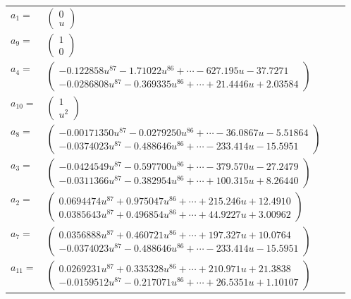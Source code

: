 \documentclass[1p]{elsarticle_modified}
\theoremstyle{definition}
\begin{document}
\begin{tabular}{m{7pt} m{180pt} m{7pt} m{180pt} }
\flushright $a_{1}=$&$\begin{pmatrix}0\\u\end{pmatrix}$ \\
\flushright $a_{9}=$&$\begin{pmatrix}1\\0\end{pmatrix}$ \\
\flushright $a_{4}=$&$\begin{pmatrix}-0.122858 u^{87}-1.71022 u^{86}+\cdots-627.195 u-37.7271\\-0.0286808 u^{87}-0.369335 u^{86}+\cdots+21.4446 u+2.03584\end{pmatrix}$ \\
\flushright $a_{10}=$&$\begin{pmatrix}1\\u^2\end{pmatrix}$ \\
\flushright $a_{8}=$&$\begin{pmatrix}-0.00171350 u^{87}-0.0279250 u^{86}+\cdots-36.0867 u-5.51864\\-0.0374023 u^{87}-0.488646 u^{86}+\cdots-233.414 u-15.5951\end{pmatrix}$ \\
\flushright $a_{3}=$&$\begin{pmatrix}-0.0424549 u^{87}-0.597700 u^{86}+\cdots-379.570 u-27.2479\\-0.0311366 u^{87}-0.382954 u^{86}+\cdots+100.315 u+8.26440\end{pmatrix}$ \\
\flushright $a_{2}=$&$\begin{pmatrix}0.0694474 u^{87}+0.975047 u^{86}+\cdots+215.246 u+12.4910\\0.0385643 u^{87}+0.496854 u^{86}+\cdots+44.9227 u+3.00962\end{pmatrix}$ \\
\flushright $a_{7}=$&$\begin{pmatrix}0.0356888 u^{87}+0.460721 u^{86}+\cdots+197.327 u+10.0764\\-0.0374023 u^{87}-0.488646 u^{86}+\cdots-233.414 u-15.5951\end{pmatrix}$ \\
\flushright $a_{11}=$&$\begin{pmatrix}0.0269231 u^{87}+0.335328 u^{86}+\cdots+210.971 u+21.3838\\-0.0159512 u^{87}-0.217071 u^{86}+\cdots+26.5351 u+1.10107\end{pmatrix}$ \\

\end{tabular}
\end{document}
